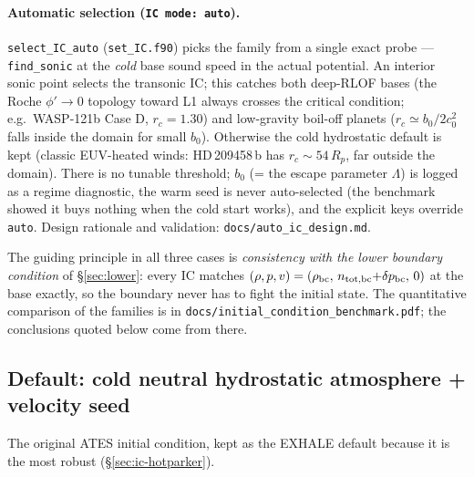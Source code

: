 \documentclass[english,a4paper]{kiseon_memo}
\begin{document}
\paragraph{Automatic selection (\texttt{IC mode: auto}).}
\texttt{select\_IC\_auto} (\texttt{set\_IC.f90}) picks the family from a
single exact probe --- \texttt{find\_sonic} at the \emph{cold} base
sound speed in the actual potential. An interior sonic point selects
the transonic IC; this catches both deep-RLOF bases (the Roche
$\phi'\to0$ topology toward L1 always crosses the critical condition;
e.g.\ WASP-121b Case D, $r_c=1.30$) and low-gravity boil-off planets
($r_c \simeq b_0/2c_0^2$ falls inside the domain for small $b_0$).
Otherwise the cold hydrostatic default is kept (classic EUV-heated
winds: HD\,209458\,b has $r_c\sim54\,R_p$, far outside the domain).
There is no tunable threshold; $b_0$ (= the escape parameter $\Lambda$)
is logged as a regime diagnostic, the warm seed is never auto-selected
(the benchmark showed it buys nothing when the cold start works), and
the explicit keys override \texttt{auto}. Design rationale and
validation: \texttt{docs/auto\_ic\_design.md}.

The guiding principle in all three cases is \emph{consistency with the
lower boundary condition} of \S\ref{sec:lower}: every IC matches
$(\rho, p, v) = (\rho_{\rm bc},\, n_{\rm tot,bc}{+}\delta p_{\rm bc},\, 0)$ at the
base exactly, so the boundary never has to fight the initial state.
The quantitative comparison of the families is in
\texttt{docs/initial\_condition\_benchmark.pdf}; the conclusions
quoted below come from there.

\subsection{Default: cold neutral hydrostatic atmosphere + velocity seed}
\label{sec:ic-hydrostatic}

The original ATES initial condition, kept as the EXHALE default
because it is the most robust (\S\ref{sec:ic-hotparker}).
\end{document}
